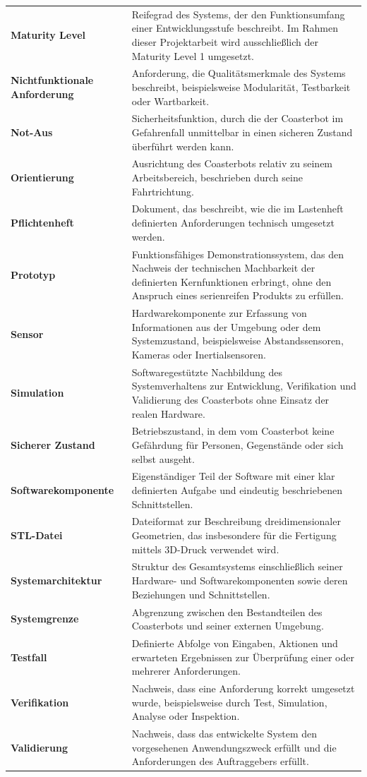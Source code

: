 \begin{longtable}[]{@{}
  >{\raggedright\arraybackslash}p{}
  >{\raggedright\arraybackslash}p{}@{}}
\textbf{Maturity Level} & Reifegrad des Systems, der den Funktionsumfang
einer Entwicklungsstufe beschreibt. Im Rahmen dieser Projektarbeit wird
ausschließlich der Maturity Level 1 umgesetzt. \\
\textbf{Nichtfunktionale Anforderung} & Anforderung, die
Qualitätsmerkmale des Systems beschreibt, beispielsweise Modularität,
Testbarkeit oder Wartbarkeit. \\
\textbf{Not-Aus} & Sicherheitsfunktion, durch die der Coasterbot im
Gefahrenfall unmittelbar in einen sicheren Zustand überführt werden
kann. \\
\textbf{Orientierung} & Ausrichtung des Coasterbots relativ zu seinem
Arbeitsbereich, beschrieben durch seine Fahrtrichtung. \\
\textbf{Pflichtenheft} & Dokument, das beschreibt, wie die im Lastenheft
definierten Anforderungen technisch umgesetzt werden. \\
\textbf{Prototyp} & Funktionsfähiges Demonstrationssystem, das den
Nachweis der technischen Machbarkeit der definierten Kernfunktionen
erbringt, ohne den Anspruch eines serienreifen Produkts zu erfüllen. \\
\textbf{Sensor} & Hardwarekomponente zur Erfassung von Informationen aus
der Umgebung oder dem Systemzustand, beispielsweise Abstandssensoren,
Kameras oder Inertialsensoren. \\
\textbf{Simulation} & Softwaregestützte Nachbildung des Systemverhaltens
zur Entwicklung, Verifikation und Validierung des Coasterbots ohne
Einsatz der realen Hardware. \\
\textbf{Sicherer Zustand} & Betriebszustand, in dem vom Coasterbot keine
Gefährdung für Personen, Gegenstände oder sich selbst ausgeht. \\
\textbf{Softwarekomponente} & Eigenständiger Teil der Software mit einer
klar definierten Aufgabe und eindeutig beschriebenen Schnittstellen. \\
\textbf{STL-Datei} & Dateiformat zur Beschreibung dreidimensionaler
Geometrien, das insbesondere für die Fertigung mittels 3D-Druck
verwendet wird. \\
\textbf{Systemarchitektur} & Struktur des Gesamtsystems einschließlich
seiner Hardware- und Softwarekomponenten sowie deren Beziehungen und
Schnittstellen. \\
\textbf{Systemgrenze} & Abgrenzung zwischen den Bestandteilen des
Coasterbots und seiner externen Umgebung. \\
\textbf{Testfall} & Definierte Abfolge von Eingaben, Aktionen und
erwarteten Ergebnissen zur Überprüfung einer oder mehrerer
Anforderungen. \\
\textbf{Verifikation} & Nachweis, dass eine Anforderung korrekt
umgesetzt wurde, beispielsweise durch Test, Simulation, Analyse oder
Inspektion. \\
\textbf{Validierung} & Nachweis, dass das entwickelte System den
vorgesehenen Anwendungszweck erfüllt und die Anforderungen des
Auftraggebers erfüllt. \\
\end{longtable}

